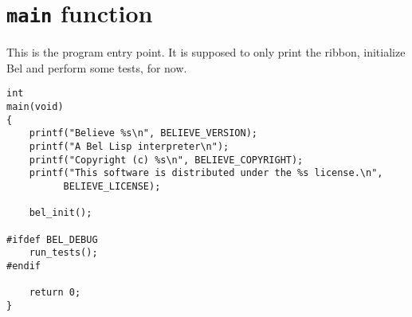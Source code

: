 \documentclass[openright,a4paper,twoside,12pt]{memoir}
\begin{document}
\section{\texttt{main} function}
\label{sec:org742f63d}

This is the program entry point. It is supposed to only print the
ribbon, initialize Bel and perform some tests, for now.

\begin{verbatim}
int
main(void)
{
    printf("Believe %s\n", BELIEVE_VERSION);
    printf("A Bel Lisp interpreter\n");
    printf("Copyright (c) %s\n", BELIEVE_COPYRIGHT);
    printf("This software is distributed under the %s license.\n",
          BELIEVE_LICENSE);

    bel_init();

#ifdef BEL_DEBUG
    run_tests();
#endif
    
    return 0;
}
\end{verbatim}
\end{document}
